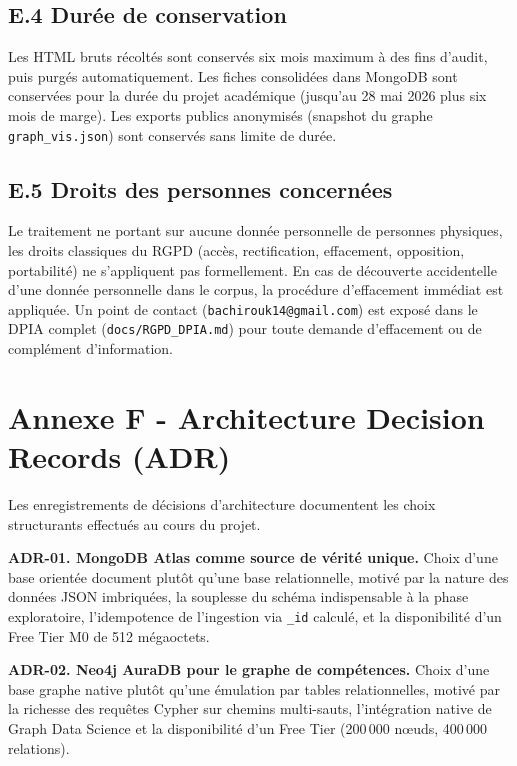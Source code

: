 \documentclass[11pt,a4paper,openany]{report}
\begin{document}
\subsection*{E.4 Dur\'ee de conservation}

Les HTML bruts r\'ecolt\'es sont conserv\'es six mois maximum \`a des fins d'audit, puis purg\'es automatiquement. Les fiches consolid\'ees dans MongoDB sont conserv\'ees pour la dur\'ee du projet acad\'emique (jusqu'au 28 mai 2026 plus six mois de marge). Les exports publics anonymis\'es (snapshot du graphe \texttt{graph\_vis.json}) sont conserv\'es sans limite de dur\'ee.

\subsection*{E.5 Droits des personnes concern\'ees}

Le traitement ne portant sur aucune donn\'ee personnelle de personnes physiques, les droits classiques du RGPD (acc\`es, rectification, effacement, opposition, portabilit\'e) ne s'appliquent pas formellement. En cas de d\'ecouverte accidentelle d'une donn\'ee personnelle dans le corpus, la proc\'edure d'effacement imm\'ediat est appliqu\'ee. Un point de contact (\texttt{bachirouk14@gmail.com}) est expos\'e dans le DPIA complet (\texttt{docs/RGPD\_DPIA.md}) pour toute demande d'effacement ou de compl\'ement d'information.

\section*{Annexe F - Architecture Decision Records (ADR)}

Les enregistrements de d\'ecisions d'architecture documentent les choix structurants effectu\'es au cours du projet.

\textbf{ADR-01. MongoDB Atlas comme source de v\'erit\'e unique.} Choix d'une base orient\'ee document plut\^ot qu'une base relationnelle, motiv\'e par la nature des donn\'ees JSON imbriqu\'ees, la souplesse du sch\'ema indispensable \`a la phase exploratoire, l'idempotence de l'ingestion via \texttt{\_id} calcul\'e, et la disponibilit\'e d'un Free Tier M0 de 512 m\'egaoctets.

\textbf{ADR-02. Neo4j AuraDB pour le graphe de comp\'etences.} Choix d'une base graphe native plut\^ot qu'une \'emulation par tables relationnelles, motiv\'e par la richesse des requ\^etes Cypher sur chemins multi-sauts, l'int\'egration native de Graph Data Science et la disponibilit\'e d'un Free Tier (200\,000 n\oe uds, 400\,000 relations).
\end{document}
